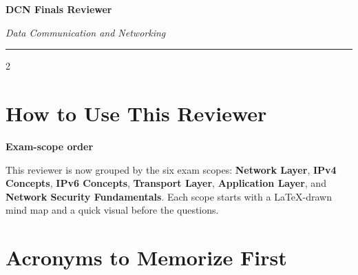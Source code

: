 \documentclass[9pt]{article}
\newcommand{\memorybox}[2]{%
  \begin{tcolorbox}[
    colback=LightRedBg,
    colframe=themeColor!35,
    boxrule=0.4pt,
    arc=2pt,
    left=5pt, right=5pt,
    top=4pt, bottom=4pt,
    before skip=3pt,
    after skip=4pt
  ]
  {\bfseries\color{themeColor}#1}\par\vspace{2pt}
  {\small\RaggedRight #2}
  \end{tcolorbox}
}
\begin{document}
\thispagestyle{fancy}

\begin{center}
  {\LARGE\bfseries\color{themeColor} DCN Finals Reviewer\par}
  \vspace{0.08cm}
  {\normalsize\itshape Data Communication and Networking\par}
  \vspace{0.04cm}
  {\color{themeColor}\rule{0.5\textwidth}{1pt}}
\end{center}
\vspace{0.04cm}

\begin{multicols}{2}

\section*{How to Use This Reviewer}

\memorybox{Exam-scope order}{
This reviewer is now grouped by the six exam scopes: \textbf{Network Layer}, \textbf{IPv4 Concepts}, \textbf{IPv6 Concepts}, \textbf{Transport Layer}, \textbf{Application Layer}, and \textbf{Network Security Fundamentals}. Each scope starts with a LaTeX-drawn mind map and a quick visual before the questions.
}

\section*{Acronyms to Memorize First}


\end{multicols}
\end{document}
